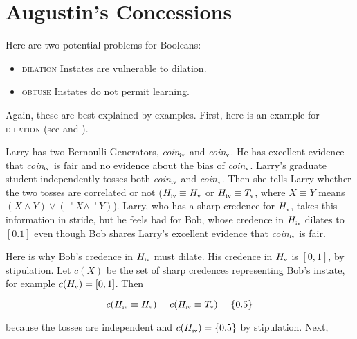 \documentclass[11pt]{article}
\begin{document}
\section{Augustin's Concessions}
\label{AugustinsConcessions}

Here are two potential problems for Booleans:

\begin{itemize}
\item \textsc{dilation} Instates are vulnerable to dilation.
\item \textsc{obtuse} Instates do not permit learning.
\end{itemize}

Again, these are best explained by examples. First, here is an example
for \textsc{dilation} (see  and
).

\begin{quotex}
  \label{ex:dilation} Larry has two Bernoulli
  Generators, \textit{coin}$_{\mbox{\tiny{iv}}}$ and
  \textit{coin}$_{\mbox{\tiny{v}}}$. He has excellent evidence that
  \textit{coin}$_{\mbox{\tiny{iv}}}$ is fair and no evidence about the
  bias of \textit{coin}$_{\mbox{\tiny{v}}}$. Larry's graduate student
  independently tosses both \textit{coin}$_{\mbox{\tiny{iv}}}$ and
  \textit{coin}$_{\mbox{\tiny{v}}}$. Then she tells Larry whether the
  two tosses are correlated or not
  ($H_{\mbox{\tiny{iv}}}\equiv{}H_{\mbox{\tiny{v}}}$ or
  $H_{\mbox{\tiny{iv}}}\equiv{}T_{\mbox{\tiny{v}}}$, where
  $X\equiv{}Y$ means
  $(X\wedge{}Y)\vee(\urcorner{}X\wedge\urcorner{}Y)$). Larry, who has
  a sharp credence for $H_{\mbox{\tiny{v}}}$, takes this information
  in stride, but he feels bad for Bob, whose credence in
  $H_{\mbox{\tiny{iv}}}$ dilates to $[0.1]$ even though Bob shares
  Larry's excellent evidence that \textit{coin}$_{\mbox{\tiny{iv}}}$
  is fair.
\end{quotex}

Here is why Bob's credence in $H_{\mbox{\tiny{iv}}}$ must dilate. His
credence in $H_{\mbox{\tiny{v}}}$ is $[0,1]$, by stipulation. Let
$c(X)$ be the set of sharp credences representing Bob's instate, for
example $c(H_{\mbox{\tiny{v}}})=[0,1]$. Then

\begin{equation}
  \label{eq:d1}
  c(H_{\mbox{\tiny{iv}}}\equiv{}H_{\mbox{\tiny{v}}})=c(H_{\mbox{\tiny{iv}}}\equiv{}T_{\mbox{\tiny{v}}})=\{0.5\}
\end{equation}

because the tosses are independent and
$c(H_{\mbox{\tiny{iv}}})=\{0.5\}$ by stipulation. Next,
\end{document}
